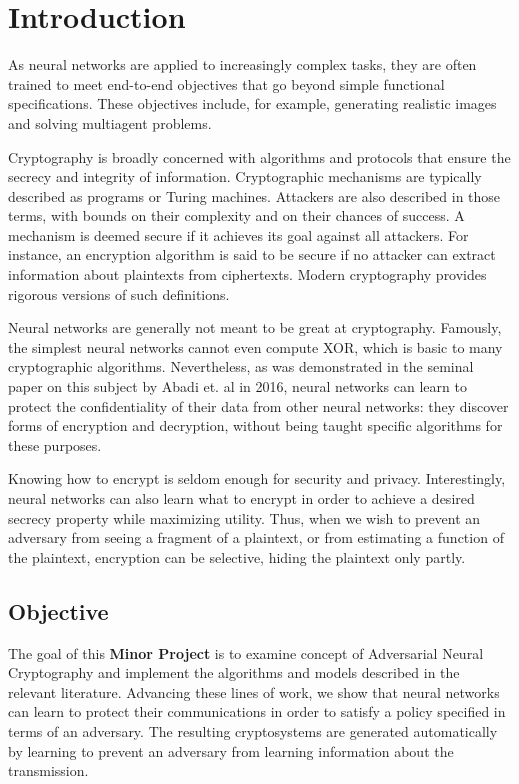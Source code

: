 \documentclass[a4paper]{article}
\begin{document}
  \section{Introduction} 
  As neural networks are applied to increasingly complex tasks, they are often trained to meet end-to-end 
  objectives that go beyond simple functional specifications. These objectives include, for
  example, generating realistic images\cite{gans} and solving multiagent problems. 

  Cryptography is broadly concerned with algorithms and protocols that ensure the secrecy and integrity
  of information. Cryptographic mechanisms are typically described as programs or Turing
  machines. Attackers are also described in those terms, with bounds on their complexity 
  and on their chances of success. A mechanism is deemed secure if it achieves its goal 
  against all attackers. For instance, an encryption algorithm is said to be secure if 
  no attacker can extract information about plaintexts from ciphertexts.
  Modern cryptography provides rigorous versions of such definitions.

  Neural networks are generally not meant to be great at cryptography. Famously, the simplest neural
  networks cannot even compute XOR, which is basic to many cryptographic algorithms. Nevertheless,
  as was demonstrated in the seminal paper on this subject\cite{seminalanc} by Abadi et. al in 2016,
  neural networks can learn to protect the confidentiality of their data from
  other neural networks: they discover forms of encryption and decryption, without being taught 
  specific algorithms for these purposes.

  Knowing how to encrypt is seldom enough for security and privacy. Interestingly, neural networks
  can also learn what to encrypt in order to achieve a desired secrecy property while maximizing
  utility. Thus, when we wish to prevent an adversary from seeing a fragment of a plaintext, or from
  estimating a function of the plaintext, encryption can be selective, hiding the plaintext only partly.

    \subsection{Objective}
    The goal of this {\bfseries Minor Project} is to examine concept of Adversarial Neural 
    Cryptography and implement the algorithms and models described in the relevant literature.
    Advancing these lines of work, we show that neural networks can learn to protect their 
    communications in order to satisfy a policy specified in terms of an adversary.
    The resulting cryptosystems are generated automatically by learning to prevent an adversary
    from learning information about the transmission.
\end{document}

